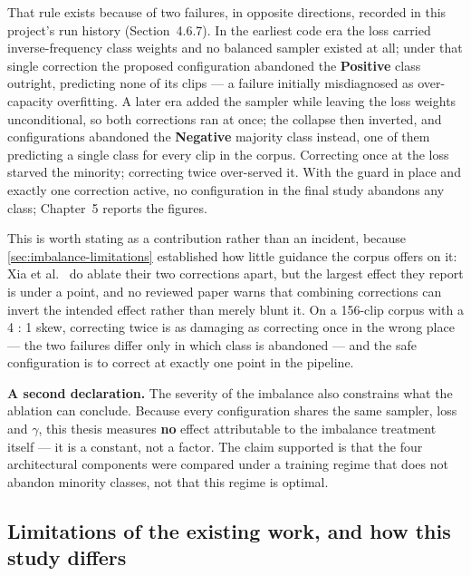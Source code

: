 That rule exists because of two failures, in opposite directions, recorded in this project's run history (Section~4.6.7). In the earliest code era the loss carried inverse-frequency class weights and no balanced sampler existed at all; under that single correction the proposed configuration abandoned the \textbf{Positive} class outright, predicting none of its clips --- a failure initially misdiagnosed as over-capacity overfitting. A later era added the sampler while leaving the loss weights unconditional, so both corrections ran at once; the collapse then inverted, and configurations abandoned the \textbf{Negative} majority class instead, one of them predicting a single class for every clip in the corpus. Correcting once at the loss starved the minority; correcting twice over-served it. With the guard in place and exactly one correction active, no configuration in the final study abandons any class; Chapter~5 reports the figures.

This is worth stating as a contribution rather than an incident, because \autoref{sec:imbalance-limitations} established how little guidance the corpus offers on it: Xia et al.~\cite{xia2020a} do ablate their two corrections apart, but the largest effect they report is under a point, and no reviewed paper warns that combining corrections can invert the intended effect rather than merely blunt it. On a 156-clip corpus with a 4 : 1 skew, correcting twice is as damaging as correcting once in the wrong place --- the two failures differ only in which class is abandoned --- and the safe configuration is to correct at exactly one point in the pipeline.

\textbf{A second declaration.} The severity of the imbalance also constrains what the ablation can conclude. Because every configuration shares the same sampler, loss and $\gamma$, this thesis measures \textbf{no} effect attributable to the imbalance treatment itself --- it is a constant, not a factor. The claim supported is that the four architectural components were compared under a training regime that does not abandon minority classes, not that this regime is optimal.

\subsection{Limitations of the existing work, and how this study differs}
\label{sec:imbalance-gap}

